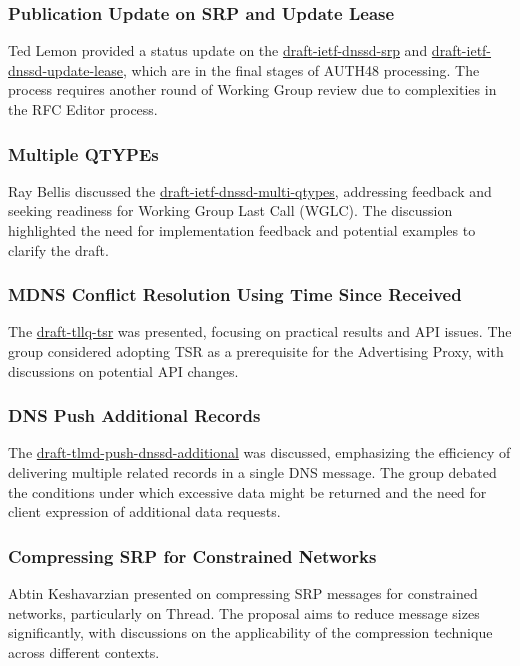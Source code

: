 \documentclass{article}
\begin{document}
\subsubsection{Publication Update on SRP and Update Lease}
Ted Lemon provided a status update on the \href{https://datatracker.ietf.org/doc/draft-ietf-dnssd-srp/}{draft-ietf-dnssd-srp} and \href{https://datatracker.ietf.org/doc/draft-ietf-dnssd-update-lease/}{draft-ietf-dnssd-update-lease}, which are in the final stages of AUTH48 processing. The process requires another round of Working Group review due to complexities in the RFC Editor process.

\subsubsection{Multiple QTYPEs}
Ray Bellis discussed the \href{https://datatracker.ietf.org/doc/draft-ietf-dnssd-multi-qtypes/}{draft-ietf-dnssd-multi-qtypes}, addressing feedback and seeking readiness for Working Group Last Call (WGLC). The discussion highlighted the need for implementation feedback and potential examples to clarify the draft.

\subsubsection{MDNS Conflict Resolution Using Time Since Received}
The \href{https://datatracker.ietf.org/doc/draft-tllq-tsr/}{draft-tllq-tsr} was presented, focusing on practical results and API issues. The group considered adopting TSR as a prerequisite for the Advertising Proxy, with discussions on potential API changes.

\subsubsection{DNS Push Additional Records}
The \href{https://datatracker.ietf.org/doc/draft-tlmd-push-dnssd-additional/}{draft-tlmd-push-dnssd-additional} was discussed, emphasizing the efficiency of delivering multiple related records in a single DNS message. The group debated the conditions under which excessive data might be returned and the need for client expression of additional data requests.

\subsubsection{Compressing SRP for Constrained Networks}
Abtin Keshavarzian presented on compressing SRP messages for constrained networks, particularly on Thread. The proposal aims to reduce message sizes significantly, with discussions on the applicability of the compression technique across different contexts.
\end{document}
